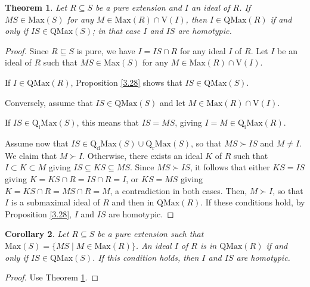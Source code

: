 \documentclass[12pt,leqno]{amsart}
\newtheorem{theorem}{Theorem}[section]
\newtheorem{corollary}[theorem]{Corollary}
\theoremstyle{definition}
\begin{document}
\begin{theorem}\label{3.5} Let $R\subseteq S$ be a pure extension and $I$ an ideal of $R$. If $MS\in\mathrm{Max}(S)$ for any $M\in\mathrm{Max}(R)\cap\mathrm{V}(I)$, then $I\in\mathrm{QMax}(R)$ if and only if $IS\in\mathrm{QMax}(S)$; in that case $I$ and $IS$ are homotypic.  
\end{theorem}
\begin{proof} Since $R\subseteq S$ is pure, we have $I=IS\cap R$ for any ideal $I$ of $R$. Let $I$ be an ideal of $R$ such that $MS\in\mathrm{Max}(S)$ for any $M\in\mathrm{Max}(R)\cap \mathrm{V}(I)$.
   
If $I\in\mathrm{QMax}(R)$, Proposition \ref{3.28} shows that $IS\in\mathrm {QMax}(S)$. 

Conversely, assume that $IS\in\mathrm{QMax}(S)$ and let $M\in\mathrm{Max}(R)\cap \mathrm{V}(I)$.

If $IS\in\mathrm{Q_iMax}(S)$, this means that $IS=MS$, giving $I=M\in\mathrm{Q_iMax}(R)$. 
  
Assume now that $IS\in\mathrm{Q_dMax}(S)\cup\mathrm{Q_rMax}(S)$, so that $MS\succ IS$ and $M\neq I$. We claim that $M\succ I$. Otherwise, there exists an ideal $K$ of $R$ such that $I\subset K\subset M$ giving $I S\subseteq KS\subseteq MS$. Since $MS\succ IS$, it follows that either $ KS=IS$ giving $K=KS\cap R=IS\cap R=I$, or $KS=MS$ giving $K=KS\cap R=MS\cap R=M$, a contradiction in both cases. Then, $M\succ I$, so that $I$ is a submaximal ideal of $R$ and then in $\mathrm{QMax}(R)$. If these conditions hold, by Proposition \ref{3.28}, $I$ and $IS$ are homotypic.
\end{proof}

\begin{corollary}\label{3.51} Let $R\subseteq S$ be a pure extension such that $\mathrm{Max}(S)=\{MS\mid M\in\mathrm{Max}(R)\}$. An ideal $I$ of $R$ is in $\mathrm{QMax}(R)$ if and only if $IS\in\mathrm{QMax}(S)$. If this condition holds, then $I$ and $IS$ are homotypic.
\end{corollary}
\begin{proof} Use Theorem \ref{3.5}.
\end{proof}
\end{document}

